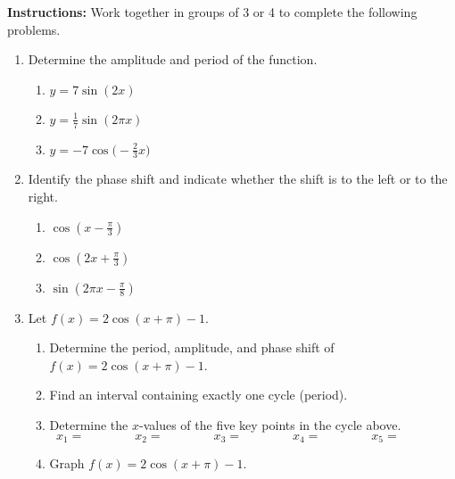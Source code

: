 


\noindent \textbf{Instructions:}  Work together in groups of  3 or 4 to complete the following problems.\\

\begin{enumerate}

\item Determine the amplitude and period of the function.
\begin{enumerate}
\item $y=7\sin(2x)$\\[.5in]
\item $\displaystyle y=\frac{1}{7}\sin(2\pi x)$\\[.5in]
\item $\displaystyle y=-7\cos\Big(-\frac{2}{3}x\Big)$\\[.5in]
\end{enumerate}

\item Identify the phase shift and indicate whether the shift is to the left or to the right.
\begin{enumerate}
\item $\displaystyle \cos(x-\frac{\pi}{3})$\vfill
\item $\displaystyle \cos(2x+\frac{\pi}{3})$\vfill
\item $\displaystyle \sin(2\pi x -\frac{\pi}{8})$\vfill
\end{enumerate}


\newpage
\item Let $f(x)=2\cos(x+\pi)-1$.

\begin{enumerate}

\item Determine the period, amplitude, and phase shift of $f(x)=2\cos(x+\pi)-1$.\vfill
\item Find an interval containing exactly one cycle (period).\vfill
\item Determine the $x$-values of the five key points in the cycle above.
$$x_1= \quad \quad \quad \quad x_2= \quad \quad \quad \quad x_3= \quad \quad \quad \quad x_4= \quad \quad \quad \quad x_5= \quad \quad \quad \quad$$
\vfill





\item Graph $f(x)=2\cos(x+\pi)-1$.

\end{enumerate}
\end{enumerate}

